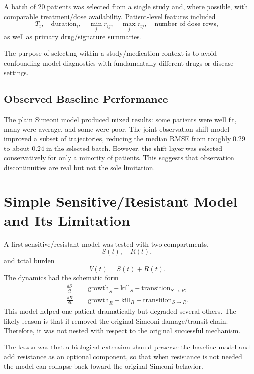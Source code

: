 \documentclass[11pt,a4paper]{article}
\begin{document}
A batch of $20$ patients was selected from a single study and, where possible, with comparable treatment/dose availability. Patient-level features included
\[
    T_i,\quad \text{duration}_i,
    \quad \min_j r_{ij},
    \quad \max_j r_{ij},
    \quad \text{number of dose rows},
\]
as well as primary drug/signature summaries.

The purpose of selecting within a study/medication context is to avoid confounding model diagnostics with fundamentally different drugs or disease settings.

\subsection{Observed Baseline Performance}

The plain Simeoni model produced mixed results: some patients were well fit, many were average, and some were poor. The joint observation-shift model improved a subset of trajectories, reducing the median RMSE from roughly $0.29$ to about $0.24$ in the selected batch. However, the shift layer was selected conservatively for only a minority of patients. This suggests that observation discontinuities are real but not the sole limitation.

\section{Simple Sensitive/Resistant Model and Its Limitation}

A first sensitive/resistant model was tested with two compartments,
\[
    S(t),\quad R(t),
\]
and total burden
\[
    V(t)=S(t)+R(t).
\]
The dynamics had the schematic form
\[
\begin{aligned}
    \frac{dS}{dt} &= \text{growth}_S - \text{kill}_S - \text{transition}_{S\to R},\\
    \frac{dR}{dt} &= \text{growth}_R - \text{kill}_R + \text{transition}_{S\to R}.
\end{aligned}
\]
This model helped one patient dramatically but degraded several others. The likely reason is that it removed the original Simeoni damage/transit chain. Therefore, it was not nested with respect to the original successful mechanism.

The lesson was that a biological extension should preserve the baseline model and add resistance as an optional component, so that when resistance is not needed the model can collapse back toward the original Simeoni behavior.
\end{document}
